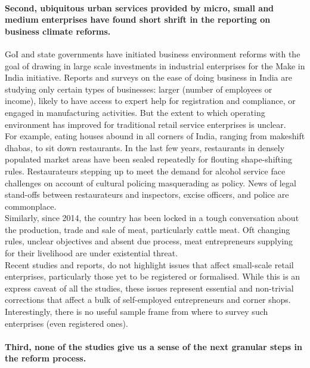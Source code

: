 \documentclass[a4paper, 12pt, twoside]{article}
\begin{document}
\paragraph{Second, ubiquitous urban services provided by micro, small and medium enterprises have found short shrift in the reporting on business climate reforms.}

GoI and state governments have initiated business environment reforms with the goal of drawing in large scale investments in industrial enterprises for the Make in India initiative. Reports and surveys on the ease of doing business in India are studying only certain types of businesses: larger (number of employees or income), likely to have access to expert help for registration and compliance, or engaged in manufacturing activities. But the extent to which operating environment has improved for traditional retail service enterprises is unclear. \\

For example, eating houses abound in all corners of India, ranging from makeshift dhabas, to sit down restaurants. In the last few years, restaurants in densely populated market areas have been sealed repeatedly for flouting shape-shifting rules. Restaurateurs stepping up to meet the demand for alcohol service face challenges on account of cultural policing masquerading as policy. News of legal stand-offs between restaurateurs and inspectors, excise officers, and police are commonplace. \\

Similarly, since 2014, the country has been locked in a tough conversation about the production, trade and sale of meat, particularly cattle meat. Oft changing rules, unclear objectives and absent due process, meat entrepreneurs supplying for their livelihood are under existential threat. \\

Recent studies and reports, do not highlight issues that affect small-scale retail enterprises, particularly those yet to be registered or formalised. While this is an express caveat of all the studies, these issues represent essential and non-trivial corrections that affect a bulk of self-employed entrepreneurs and corner shops. Interestingly, there is no useful sample frame from where to survey such enterprises (even registered ones). \\

\paragraph{Third, none of the studies give us a sense of the next granular steps in the reform process.}
\end{document}
